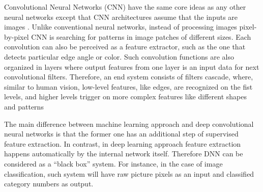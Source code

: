 Convolutional Neural Networks (CNN) have the same core ideas as any other neural networks except that CNN architectures assume that the inputs are images \cite{cs231n-conv}. Unlike conventional neural networks, instead of processing images pixel-by-pixel CNN is searching for patterns in image patches of different sizes. Each convolution can also be perceived as a feature extractor, such as the one that detects particular edge angle or color. Such convolution functions are also organized in layers where output features from one layer is an input data for next convolutional filters. Therefore, an end system consists of filters cascade, where, similar to human vision, low-level features, like edges, are recognized on the fist levels, and higher levels trigger on more complex features like different shapes and patterns \cite{Zeiler2014VisualizingNets}

The main difference between machine learning approach and deep convolutional neural networks is that the former one has an additional step of supervised feature extraction. In contrast, in deep learning approach feature extraction happens automatically by the internal network itself. Therefore DNN can be considered as a ``black box'' system. For instance, in the case of image classification, such system will have raw picture pixels as an input and classified category numbers as output.

